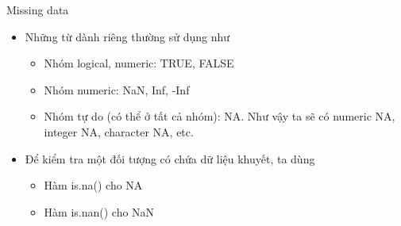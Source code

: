 \documentclass[
  ignorenonframetext,
]{beamer}
\providecommand{\tightlist}{%
  \setlength{\itemsep}{0pt}\setlength{\parskip}{0pt}}
\begin{document}
\begin{frame}{Missing data}
\protect\hypertarget{missing-data-3}{}

\begin{itemize}[<+->]
\tightlist
\item
  Những từ dành riêng thường sử dụng như

  \begin{itemize}[<+->]
  \tightlist
  \item
    Nhóm logical, numeric: TRUE, FALSE\\
  \item
    Nhóm numeric: NaN, Inf, -Inf\\
  \item
    Nhóm tự do (có thể ở tất cả nhóm): NA. Như vậy ta sẽ có numeric NA,
    integer NA, character NA, etc.
  \end{itemize}
\item
  Để kiểm tra một đối tượng có chứa dữ liệu khuyết, ta dùng

  \begin{itemize}[<+->]
  \tightlist
  \item
    Hàm is.na() cho NA\\
  \item
    Hàm is.nan() cho NaN
  \end{itemize}
\end{itemize}

\end{frame}
\end{document}
